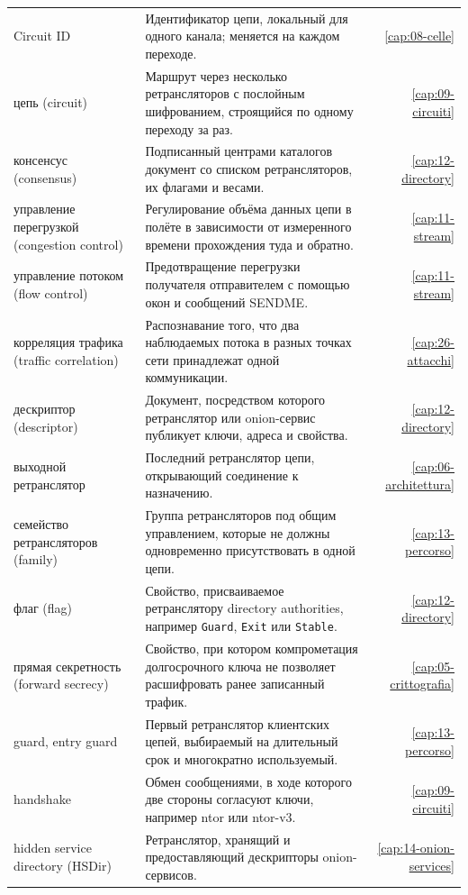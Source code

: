 {\begin{longtable}{@{}>{\raggedright\arraybackslash}p{4.1cm}>{\raggedright\arraybackslash}p{8.0cm}r@{}}
Circuit ID & Идентификатор цепи, локальный для одного канала; меняется на каждом переходе. & \ref{cap:08-celle} \\
цепь (circuit) & Маршрут через несколько ретрансляторов с послойным шифрованием, строящийся по одному переходу за раз. & \ref{cap:09-circuiti} \\
консенсус (consensus) & Подписанный центрами каталогов документ со списком ретрансляторов, их флагами и весами. & \ref{cap:12-directory} \\
управление перегрузкой (congestion control) & Регулирование объёма данных цепи в полёте в зависимости от измеренного времени прохождения туда и обратно. & \ref{cap:11-stream} \\
управление потоком (flow control) & Предотвращение перегрузки получателя отправителем с помощью окон и сообщений SENDME. & \ref{cap:11-stream} \\
корреляция трафика (traffic correlation) & Распознавание того, что два наблюдаемых потока в разных точках сети принадлежат одной коммуникации. & \ref{cap:26-attacchi} \\
дескриптор (descriptor) & Документ, посредством которого ретранслятор или onion-сервис публикует ключи, адреса и свойства. & \ref{cap:12-directory} \\
выходной ретранслятор & Последний ретранслятор цепи, открывающий соединение к назначению. & \ref{cap:06-architettura} \\
семейство ретрансляторов (family) & Группа ретрансляторов под общим управлением, которые не должны одновременно присутствовать в одной цепи. & \ref{cap:13-percorso} \\
флаг (flag) & Свойство, присваиваемое ретранслятору directory authorities, например \texttt{Guard}, \texttt{Exit} или \texttt{Stable}. & \ref{cap:12-directory} \\
прямая секретность (forward secrecy) & Свойство, при котором компрометация долгосрочного ключа не позволяет расшифровать ранее записанный трафик. & \ref{cap:05-crittografia} \\
guard, entry guard & Первый ретранслятор клиентских цепей, выбираемый на длительный срок и многократно используемый. & \ref{cap:13-percorso} \\
handshake & Обмен сообщениями, в ходе которого две стороны согласуют ключи, например ntor или ntor-v3. & \ref{cap:09-circuiti} \\
hidden service directory (HSDir) & Ретранслятор, хранящий и предоставляющий дескрипторы onion-сервисов. & \ref{cap:14-onion-services} \\

\end{longtable}}

